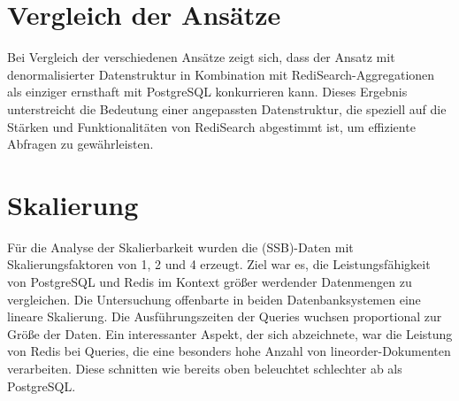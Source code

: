 \newpage
\section{Vergleich der Ansätze}
Bei Vergleich der verschiedenen Ansätze zeigt sich, dass der Ansatz mit denormalisierter Datenstruktur in Kombination mit RediSearch-Aggregationen als einziger ernsthaft mit PostgreSQL konkurrieren kann. Dieses Ergebnis unterstreicht die Bedeutung einer angepassten Datenstruktur, die speziell auf die Stärken und Funktionalitäten von RediSearch abgestimmt ist, um effiziente Abfragen zu gewährleisten.


\section{Skalierung}
Für die Analyse der Skalierbarkeit wurden die (SSB)-Daten mit Skalierungsfaktoren von 1, 2 und 4 erzeugt. Ziel war es, die Leistungsfähigkeit von PostgreSQL und Redis im Kontext größer werdender Datenmengen zu vergleichen. Die Untersuchung offenbarte in beiden Datenbanksystemen eine lineare Skalierung. Die Ausführungszeiten der Queries wuchsen proportional zur Größe der Daten. Ein interessanter Aspekt, der sich abzeichnete, war die Leistung von Redis bei Queries, die eine besonders hohe Anzahl von lineorder-Dokumenten verarbeiten. Diese schnitten wie bereits oben beleuchtet schlechter ab als PostgreSQL.

